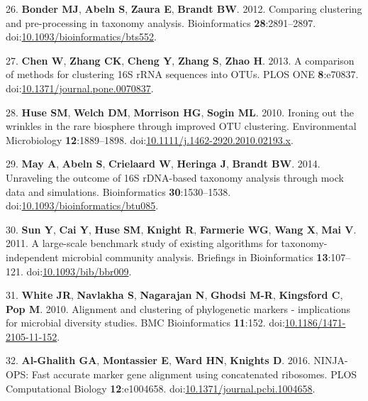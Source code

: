\documentclass[11pt,]{article}
\begin{document}
\hypertarget{ref-Bonder2012}{}
26. \textbf{Bonder MJ}, \textbf{Abeln S}, \textbf{Zaura E},
\textbf{Brandt BW}. 2012. Comparing clustering and pre-processing in
taxonomy analysis. Bioinformatics \textbf{28}:2891--2897.
doi:\href{https://doi.org/10.1093/bioinformatics/bts552}{10.1093/bioinformatics/bts552}.

\hypertarget{ref-Chen2013}{}
27. \textbf{Chen W}, \textbf{Zhang CK}, \textbf{Cheng Y}, \textbf{Zhang
S}, \textbf{Zhao H}. 2013. A comparison of methods for clustering 16S
rRNA sequences into OTUs. PLOS ONE \textbf{8}:e70837.
doi:\href{https://doi.org/10.1371/journal.pone.0070837}{10.1371/journal.pone.0070837}.

\hypertarget{ref-Huse2010}{}
28. \textbf{Huse SM}, \textbf{Welch DM}, \textbf{Morrison HG},
\textbf{Sogin ML}. 2010. Ironing out the wrinkles in the rare biosphere
through improved OTU clustering. Environmental Microbiology
\textbf{12}:1889--1898.
doi:\href{https://doi.org/10.1111/j.1462-2920.2010.02193.x}{10.1111/j.1462-2920.2010.02193.x}.

\hypertarget{ref-May2014}{}
29. \textbf{May A}, \textbf{Abeln S}, \textbf{Crielaard W},
\textbf{Heringa J}, \textbf{Brandt BW}. 2014. Unraveling the outcome of
16S rDNA-based taxonomy analysis through mock data and simulations.
Bioinformatics \textbf{30}:1530--1538.
doi:\href{https://doi.org/10.1093/bioinformatics/btu085}{10.1093/bioinformatics/btu085}.

\hypertarget{ref-Sun2011}{}
30. \textbf{Sun Y}, \textbf{Cai Y}, \textbf{Huse SM}, \textbf{Knight R},
\textbf{Farmerie WG}, \textbf{Wang X}, \textbf{Mai V}. 2011. A
large-scale benchmark study of existing algorithms for
taxonomy-independent microbial community analysis. Briefings in
Bioinformatics \textbf{13}:107--121.
doi:\href{https://doi.org/10.1093/bib/bbr009}{10.1093/bib/bbr009}.

\hypertarget{ref-White2010}{}
31. \textbf{White JR}, \textbf{Navlakha S}, \textbf{Nagarajan N},
\textbf{Ghodsi M-R}, \textbf{Kingsford C}, \textbf{Pop M}. 2010.
Alignment and clustering of phylogenetic markers - implications for
microbial diversity studies. BMC Bioinformatics \textbf{11}:152.
doi:\href{https://doi.org/10.1186/1471-2105-11-152}{10.1186/1471-2105-11-152}.

\hypertarget{ref-AlGhalith2016}{}
32. \textbf{Al-Ghalith GA}, \textbf{Montassier E}, \textbf{Ward HN},
\textbf{Knights D}. 2016. NINJA-OPS: Fast accurate marker gene alignment
using concatenated ribosomes. PLOS Computational Biology
\textbf{12}:e1004658.
doi:\href{https://doi.org/10.1371/journal.pcbi.1004658}{10.1371/journal.pcbi.1004658}.
\end{document}
